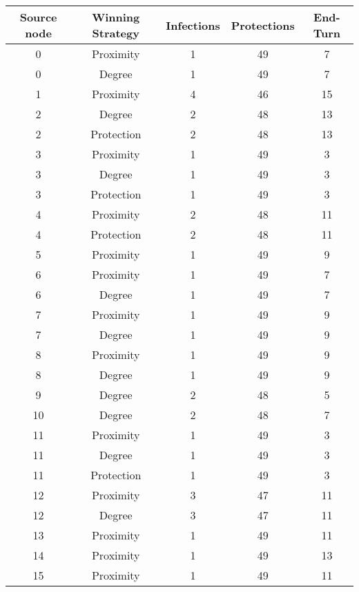 \documentclass[results.tex]{subfiles}
\begin{document}
\begin{center}
  \begin{tabular}{| c || c | c | c | c |}
    \hline
    {\bfseries Source node} & {\bfseries Winning Strategy} & {\bfseries Infections} & {\bfseries Protections} & {\bfseries End-Turn} \\  %
    \hline\hline
    0 & Proximity & 1 & 49 & 7 \\ 
    \hline
    0 & Degree & 1 & 49 & 7 \\ 
    \hline
    1 & Proximity & 4 & 46 & 15 \\ 
    \hline
    2 & Degree & 2 & 48 & 13 \\ 
    \hline
    2 & Protection & 2 & 48 & 13 \\ 
    \hline
    3 & Proximity & 1 & 49 & 3 \\ 
    \hline
    3 & Degree & 1 & 49 & 3 \\ 
    \hline
    3 & Protection & 1 & 49 & 3 \\ 
    \hline
    4 & Proximity & 2 & 48 & 11 \\ 
    \hline
    4 & Protection & 2 & 48 & 11 \\ 
    \hline
    5 & Proximity & 1 & 49 & 9 \\ 
    \hline
    6 & Proximity & 1 & 49 & 7 \\ 
    \hline
    6 & Degree & 1 & 49 & 7 \\ 
    \hline
    7 & Proximity & 1 & 49 & 9 \\ 
    \hline
    7 & Degree & 1 & 49 & 9 \\ 
    \hline
    8 & Proximity & 1 & 49 & 9 \\ 
    \hline
    8 & Degree & 1 & 49 & 9 \\ 
    \hline
    9 & Degree & 2 & 48 & 5 \\ 
    \hline
    10 & Degree & 2 & 48 & 7 \\ 
    \hline
    11 & Proximity & 1 & 49 & 3 \\ 
    \hline
    11 & Degree & 1 & 49 & 3 \\ 
    \hline
    11 & Protection & 1 & 49 & 3 \\ 
    \hline
    12 & Proximity & 3 & 47 & 11 \\ 
    \hline
    12 & Degree & 3 & 47 & 11 \\ 
    \hline
    13 & Proximity & 1 & 49 & 11 \\ 
    \hline
    14 & Proximity & 1 & 49 & 13 \\ 
    \hline
    15 & Proximity & 1 & 49 & 11 \\ 

\end{tabular}
\end{center}
\end{document}
